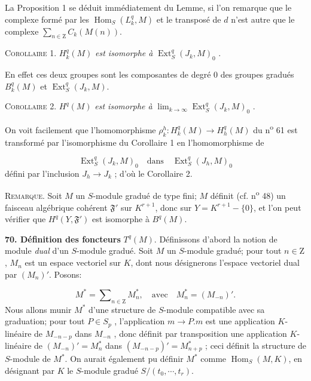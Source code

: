 
La Proposition 1 se déduit immédiatement du Lemme, si l'on remarque que le complexe formé par les $\operatorname{Hom}_S(L_k^q, M)$ et le transposé de $d$ n'est autre que le complexe $\sum_{n \in \mathrm{Z}} C_k(M(n))$.

\textsc{Corollaire} 1. $H_k^q(M)$ \textit{est isomorphe à} $\operatorname{Ext}_S^q(J_k , M)_0$ .

En effet ces deux groupes sont les composantes de degré 0 des groupes gradués $B_k^q(M)$ et $\operatorname{Ext}_S^q(J_k , M)$.

\textsc{Corollaire} 2. $H^q(M)$ \textit{est isomorphe à} $\lim_{k \to \infty} \operatorname{Ext}_S^q(J_k , M)_0$ .

On voit facilement que l'homomorphisme $\rho_k^h : H_k^q(M) \to H_h^q(M)$ du n\textsuperscript{o} 61 est transformé par l'isomorphisme du Corollaire 1 en l'homomorphisme de

\begin{equation*}
\operatorname{Ext}_S^q(J_k , M)_0 \quad \text{dans} \quad \operatorname{Ext}_S^q(J_h , M)_0
\end{equation*}
défini par l'inclusion $J_h \to J_k$ ; d'où le Corollaire 2.

\textsc{Remarque}. Soit $M$ un $S$-module gradué de type fini; $M$ définit (cf. n\textsuperscript{o} 48) un faisceau algébrique cohérent $\mathfrak{F}'$ sur $K^{r+1}$, donc sur $Y = K^{r+1} - \{0\}$, et l'on peut vérifier que $H^q(Y, \mathfrak{F}')$ est isomorphe à $B^q(M)$.

\textbf{70. Définition des foncteurs} $T^q(M)$. Définissons d'abord la notion de module \textit{dual} d'un $S$-module gradué. Soit $M$ un $S$-module gradué; pour tout $n \in \mathrm{Z}$, $M_n$ est un espace vectoriel sur $K$, dont nous désignerons l'espace vectoriel dual par $(M_n)'$. Posons:

\begin{equation*}
M^* = \sum\nolimits_{n \in \mathrm{Z}} M_n^* , \quad \text{avec} \quad M_n^* = (M_{-n})'.
\end{equation*}
Nous allons munir $M^*$ d'une structure de $S$-module compatible avec sa graduation; pour tout $P \in S_p$ , l'application $m \to P.m$ est une application $K$-linéaire de $M_{-n-p}$ dans $M_{-n}$ , donc définit par transposition une application $K$-linéaire de $(M_{-n})' = M_n^*$ dans $(M_{-n-p})' = M_{n+p}^*$ ; ceci définit la structure de $S$-module de $M^*$. On aurait également pu définir $M^*$ comme $\operatorname{Hom}_S(M, K)$, en désignant par $K$ le $S$-module gradué $S/(t_0 , \cdots , t_r)$.


